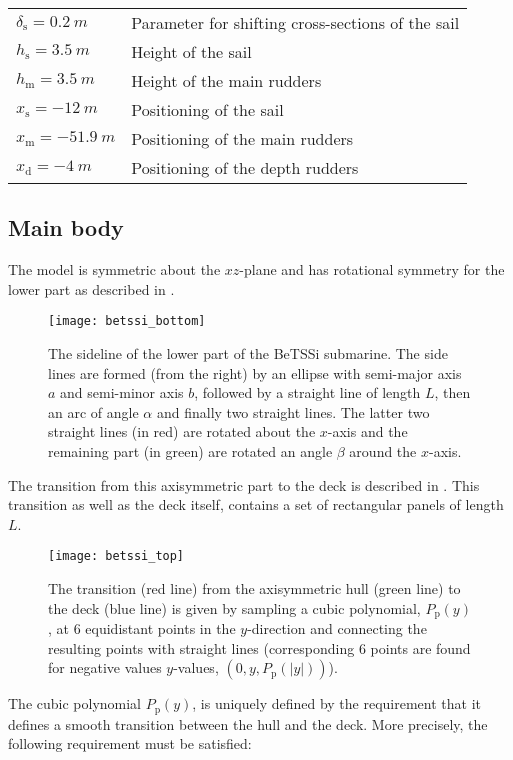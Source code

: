 \begin{table}
\begin{tabular}{l l}
		$\delta_{\mathrm{s}}=\SI{0.2}{m}$ & Parameter for shifting cross-sections of the sail\\
		$h_{\mathrm{s}}=\SI{3.5}{m}$ & Height of the sail\\
		$h_{\mathrm{m}}=\SI{3.5}{m}$ & Height of the main rudders\\
		$x_{\mathrm{s}}=-\SI{12}{m}$ & Positioning of the sail\\
		$x_{\mathrm{m}}=-\SI{51.9}{m}$ & Positioning of the main rudders\\
		$x_{\mathrm{d}}=-\SI{4}{m}$ & Positioning of the depth rudders\\
		\bottomrule
	\end{tabular}
\end{table}

\subsection{Main body}
The model is symmetric about the $xz$-plane and has rotational symmetry for the lower part as described in .
\begin{figure}
	\centering
	\texttt{[image: betssi\_bottom]}
	\caption{The sideline of the lower part of the BeTSSi submarine. The side lines are formed (from the right) by an ellipse with semi-major axis $a$ and semi-minor axis $b$, followed by a straight line of length $L$, then an arc of angle $\alpha$ and finally two straight lines. The latter two straight lines (in red) are rotated about the $x$-axis and the remaining part (in green) are rotated an angle $\beta$ around the $x$-axis.}
	\label{Fig3:bettsi_bottom}
\end{figure}
The transition from this axisymmetric part to the deck is described in . This transition as well as the deck itself, contains a set of rectangular panels of length $L$.
\begin{figure}
	\centering
	\texttt{[image: betssi\_top]}
	\caption{The transition (red line) from the axisymmetric hull (green line) to the deck (blue line) is given by sampling a cubic polynomial, $P_{\mathrm{p}}(y)$, at 6 equidistant points in the $y$-direction and connecting the resulting points with straight lines (corresponding 6 points are found for negative values $y$-values, $(0,y,P_{\mathrm{p}}(|y|))$).}
	\label{Fig3:bettsi_top}
\end{figure}
The cubic polynomial $P_{\mathrm{p}}(y)$, is uniquely defined by the requirement that it defines a smooth transition between the hull and the deck. More precisely, the following requirement must be satisfied: 
